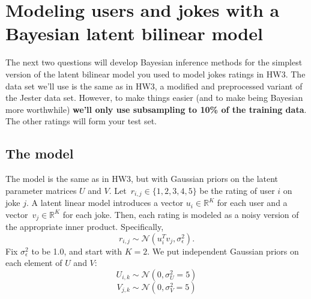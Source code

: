 \documentclass[submit]{harvardml}
\newcommand{\R}{\mathbb{R}}
\theoremstyle{plain}
\begin{document}
\newpage
\section*{Modeling users and jokes with a Bayesian latent bilinear model}

The next two questions will develop Bayesian inference methods for the simplest version of the latent bilinear model you used to model jokes ratings in HW3. The data set we'll use is the same as in HW3, a modified and preprocessed variant of the Jester data set. However, to make things easier (and to make being Bayesian more worthwhile) {\bf we'll only use subsampling to 10\% of the training data}.  The other ratings will form your test set.

\subsection*{The model}

The model is the same as in HW3, but with Gaussian priors on the latent parameter matrices $U$ and $V$. Let~${r_{i,j}\in\{1,2,3,4,5\}}$ be the rating of user $i$ on joke $j$.  A latent linear model introduces a vector ${u_i\in\R^K}$ for each user and a vector~${v_j\in\R^K}$ for each joke.  Then, each rating is modeled as a noisy version of the appropriate inner product. Specifically,
\[
r_{i,j} \sim \mathcal{N}(u_i^T v_j, \sigma_\epsilon^2).
\]
Fix $\sigma_\epsilon^2$ to be 1.0, and start with $K = 2$. We put independent Gaussian priors on each element of $U$ and $V$:
\[U_{i,k} \sim \mathcal{N}(0, \sigma_U^2=5)\]
\[V_{j,k} \sim \mathcal{N}(0, \sigma_V^2=5)\]
\end{document}
